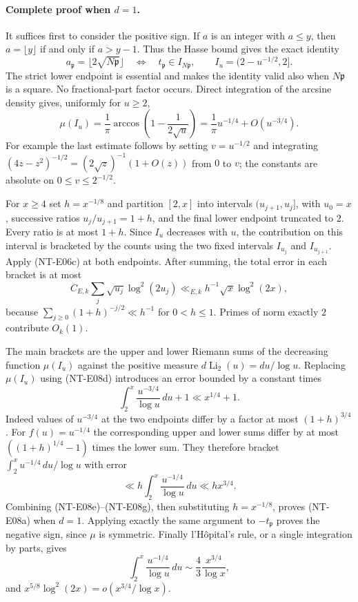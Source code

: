 \paragraph{Complete proof when $d=1$.}
It suffices first to consider the positive sign. If $a$ is an integer
with $a\le y$, then $a=\lfloor y\rfloor$ if and only if $a>y-1$.
Thus the Hasse bound gives the exact identity
\[
 a_{\mathfrak p}=\lfloor2\sqrt{N\mathfrak p}\rfloor
 \quad\Longleftrightarrow\quad
 t_{\mathfrak p}\in I_{N\mathfrak p},\qquad
 I_u=(2-u^{-1/2},2].                                    \tag{NT-E08c}
\]
The strict lower endpoint is essential and makes the identity valid
also when $N\mathfrak p$ is a square. No fractional-part factor occurs.
Direct integration of the arcsine density gives, uniformly for $u\ge2$,
\[
 \mu(I_u)=\frac1\pi\arccos\!\left(1-\frac1{2\sqrt u}\right)
         =\frac1\pi u^{-1/4}+O(u^{-3/4}).                 \tag{NT-E08d}
\]
For example the last estimate follows by setting $v=u^{-1/2}$ and
integrating $(4z-z^2)^{-1/2}=(2\sqrt z)^{-1}(1+O(z))$
from $0$ to $v$; the constants are absolute on $0\le v\le2^{-1/2}$.

For $x\ge4$ set $h=x^{-1/8}$ and partition $[2,x]$ into intervals
$(u_{j+1},u_j]$, with $u_0=x$, successive ratios $u_j/u_{j+1}=1+h$,
and the final lower endpoint truncated to $2$. Every ratio is at most
$1+h$. Since $I_u$ decreases with $u$, the contribution on this
interval is bracketed by the counts using the two fixed intervals
$I_{u_j}$ and $I_{u_{j+1}}$. Apply (NT-E06c) at both endpoints.
After summing, the total error in each bracket is at most
\[
 C_{E,k}\sum_j\sqrt{u_j}\log^2(2u_j)
       \ll_{E,k}h^{-1}\sqrt x\log^2(2x),                 \tag{NT-E08e}
\]
because $\sum_{j\ge0}(1+h)^{-j/2}\ll h^{-1}$ for $0<h\le1$.
Primes of norm exactly $2$ contribute $O_k(1)$.

The main brackets are the upper and lower Riemann sums of the
decreasing function $\mu(I_u)$ against the positive measure
$d\operatorname{Li}_2(u)=du/\log u$. Replacing $\mu(I_u)$ using
(NT-E08d) introduces an error bounded by a constant times
\[
 \int_2^x\frac{u^{-3/4}}{\log u}\,du+1
      \ll x^{1/4}+1.                                   \tag{NT-E08f}
\]
Indeed values of $u^{-3/4}$ at the two endpoints differ by a factor
at most $(1+h)^{3/4}$. For $f(u)=u^{-1/4}$ the corresponding
upper and lower sums differ by at most
$((1+h)^{1/4}-1)$ times the lower sum. They therefore bracket
$\int_2^x u^{-1/4}\,du/\log u$ with error
\[
 \ll h\int_2^x\frac{u^{-1/4}}{\log u}\,du
 \ll h x^{3/4}.                                       \tag{NT-E08g}
\]
Combining (NT-E08e)--(NT-E08g), then substituting $h=x^{-1/8}$,
proves (NT-E08a) when $d=1$. Applying exactly the same argument to
$-t_{\mathfrak p}$ proves the negative sign, since $\mu$ is symmetric.
Finally l'H\^opital's rule, or a single integration by parts, gives
\[
 \int_2^x\frac{u^{-1/4}}{\log u}\,du
      \sim \frac43\frac{x^{3/4}}{\log x},
\]
and $x^{5/8}\log^2(2x)=o(x^{3/4}/\log x)$.

